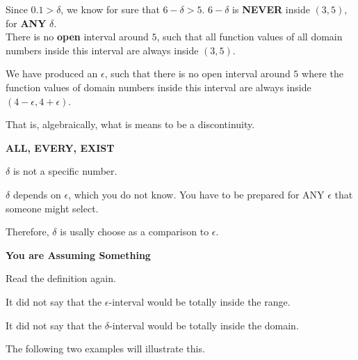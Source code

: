 \documentclass{ximera}
\begin{document}
\begin{example}
Since $0.1 > \delta$, we know for sure that $6 - \delta > 5$.  
$6 - \delta$ is \textbf{\textcolor{red!70!black}{NEVER}} inside $(3, 5)$, for \textbf{\textcolor{red!70!black}{ANY}} $\delta$.\\



There is no \textbf{open} interval around $5$, such that all function values of all domain numbers inside this interval are always inside $(3,5)$. 




We have produced an $\epsilon$, such that there is no open interval around $5$ where the function values of domain numbers inside this interval are always inside $(4-\epsilon , 4+\epsilon)$.


That is, algebraically, what is means to be a discontinuity.




\end{example}








\begin{warning} \textbf{\textcolor{red!70!black}{ALL, EVERY, EXIST}}


$\delta$ is not a specific number.  

$\delta$ depends on $\epsilon$, which you do not know. You have to be prepared for ANY $\epsilon$ that someone might select.

Therefore, $\delta$ is usally choose as a comparison to $\epsilon$.




\end{warning}








\begin{warning} \textbf{\textcolor{red!70!black}{You are Assuming Something}}

Read the definition again. 

It did not say that the $\epsilon$-interval would be totally inside the range. 

It did not say that the $\delta$-interval would be totally inside the domain. 

\end{warning}


The following two examples will illustrate this.
\end{document}
